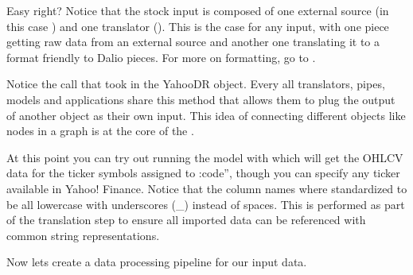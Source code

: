 \documentclass[letterpaper,10pt,english]{sphinxmanual}
\begin{document}
Easy right? Notice that the stock input is composed of one external source (in this case ) and one translator (). This is the case for any input, with one piece getting raw data from an external source and another one translating it to a format friendly to Dal\sphinxhyphen{}io pieces. For more on formatting, go to .

Notice the  call that took in the YahooDR object. Every all translators, pipes, models and applications share this method that allows them to plug the output of another object as their own input. This idea of connecting different objects like nodes in a graph is at the core of the .

At this point you can try out running the model with  which will get the OHLCV data for the ticker symbols assigned to :code”, though you can specify any ticker available in Yahoo! Finance. Notice that the column names where standardized to be all lower\sphinxhyphen{}case with underscores (\_) instead of spaces. This is performed as part of the translation step to ensure all imported data can be referenced with common string representations.

Now lets create a data processing pipeline for our input data.
\end{document}

